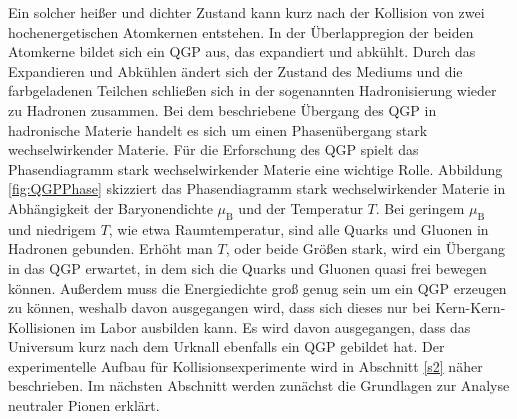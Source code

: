 \newline
Ein solcher hei{\ss}er und dichter Zustand kann kurz nach der Kollision von zwei hochenergetischen Atomkernen entstehen.
In der \"Uberlappregion der beiden Atomkerne bildet sich ein QGP aus, das expandiert und abk\"uhlt.
Durch das Expandieren und Abk\"uhlen \"andert sich der Zustand des Mediums und die farbgeladenen Teilchen schlie{\ss}en sich in der sogenannten Hadronisierung wieder zu Hadronen zusammen.
Bei dem beschriebene \"Ubergang des QGP in hadronische Materie handelt es sich um einen Phasen\"ubergang stark wechselwirkender Materie.
\newline
F\"ur die Erforschung des QGP spielt das Phasendiagramm stark wechselwirkender Materie eine wichtige Rolle.
Abbildung \ref{fig:QGPPhase} skizziert das Phasendiagramm stark wechselwirkender Materie in Abh\"angigkeit der Baryonendichte $\mu_{\text{B}}$ und der Temperatur $T$.
Bei geringem $\mu_{\text{B}}$ und niedrigem $T$, wie etwa Raumtemperatur, sind alle Quarks und Gluonen in Hadronen gebunden.
Erh\"oht man $T$, oder beide Gr\"o{\ss}en stark, wird ein \"Ubergang in das QGP erwartet, in dem sich die Quarks und Gluonen quasi frei bewegen k\"onnen.
Au{\ss}erdem muss die Energiedichte gro{\ss} genug sein um ein QGP erzeugen zu k\"onnen, weshalb davon ausgegangen wird, dass sich dieses nur bei Kern-Kern-Kollisionen im Labor ausbilden kann.
Es wird davon ausgegangen, dass das Universum kurz nach dem Urknall ebenfalls ein QGP gebildet hat.
\newline
Der experimentelle Aufbau f\"ur Kollisionsexperimente wird in Abschnitt \ref{s2} n\"aher beschrieben.
Im n\"achsten Abschnitt werden zun\"achst die Grundlagen zur Analyse neutraler Pionen erkl\"art.




